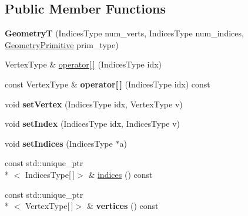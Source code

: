 \subsection*{Public Member Functions}
\begin{DoxyCompactItemize}
\item 
\hypertarget{classs9_1_1GeometryT_aa795fcee546fdcee413e11b47e910c12}{{\bfseries Geometry\-T} (Indices\-Type num\-\_\-verts, Indices\-Type num\-\_\-indices, \hyperlink{namespaces9_ad57d1332f8fd67d23f6a1d3520ab785c}{Geometry\-Primitive} prim\-\_\-type)}\label{classs9_1_1GeometryT_aa795fcee546fdcee413e11b47e910c12}

\item 
Vertex\-Type \& \hyperlink{classs9_1_1GeometryT_a8326983bbd778d6433a4f83bab3bf555}{operator\mbox{[}$\,$\mbox{]}} (Indices\-Type idx)
\item 
\hypertarget{classs9_1_1GeometryT_afad1786f6a50bdf2818a47a3e21c6979}{const Vertex\-Type \& {\bfseries operator\mbox{[}$\,$\mbox{]}} (Indices\-Type idx) const }\label{classs9_1_1GeometryT_afad1786f6a50bdf2818a47a3e21c6979}

\item 
\hypertarget{classs9_1_1GeometryT_a368f92e77aea92cf3acf97d7a894cd00}{void {\bfseries set\-Vertex} (Indices\-Type idx, Vertex\-Type v)}\label{classs9_1_1GeometryT_a368f92e77aea92cf3acf97d7a894cd00}

\item 
\hypertarget{classs9_1_1GeometryT_a6629dd7b2419ad8dde4ade6c3118c79e}{void {\bfseries set\-Index} (Indices\-Type idx, Indices\-Type v)}\label{classs9_1_1GeometryT_a6629dd7b2419ad8dde4ade6c3118c79e}

\item 
\hypertarget{classs9_1_1GeometryT_ae81510a4200bd090ca7b05f79510b62e}{void {\bfseries set\-Indices} (Indices\-Type $\ast$a)}\label{classs9_1_1GeometryT_ae81510a4200bd090ca7b05f79510b62e}

\item 
const std\-::unique\-\_\-ptr\\*
$<$ Indices\-Type\mbox{[}$\,$\mbox{]}$>$ \& \hyperlink{classs9_1_1GeometryT_acde81a6b14f995e64ec5480dc1c3ad83}{indices} () const 
\item 
\hypertarget{classs9_1_1GeometryT_af02621434de2b7049fa47ee98251b8a5}{const std\-::unique\-\_\-ptr\\*
$<$ Vertex\-Type\mbox{[}$\,$\mbox{]}$>$ \& {\bfseries vertices} () const }\label{classs9_1_1GeometryT_af02621434de2b7049fa47ee98251b8a5}


\end{DoxyCompactItemize}
